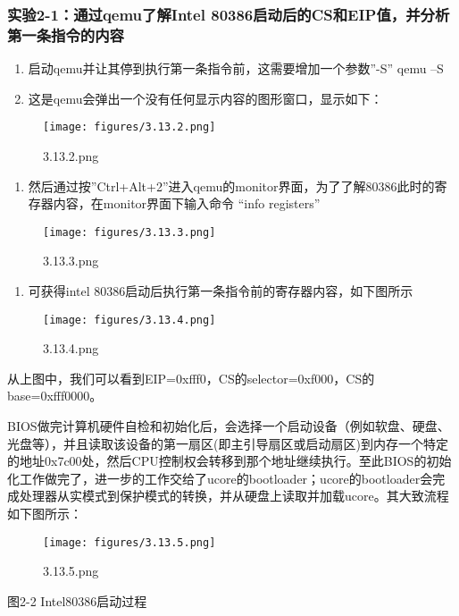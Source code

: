 \subsubsection{实验2-1：通过qemu了解Intel
80386启动后的CS和EIP值，并分析第一条指令的内容}\label{ux5b9eux9a8c2-1ux901aux8fc7qemuux4e86ux89e3intel-80386ux542fux52a8ux540eux7684csux548ceipux503cux5e76ux5206ux6790ux7b2cux4e00ux6761ux6307ux4ee4ux7684ux5185ux5bb9}

\begin{enumerate}
\def\labelenumi{\arabic{enumi}.}
\tightlist
\item
  启动qemu并让其停到执行第一条指令前，这需要增加一个参数''-S'' qemu --S
\item
  这是qemu会弹出一个没有任何显示内容的图形窗口，显示如下：
\end{enumerate}

\begin{figure}[htbp]
\centering
\texttt{[image: figures/3.13.2.png]}
\caption{3.13.2.png}
\end{figure}

\begin{enumerate}
\def\labelenumi{\arabic{enumi}.}
\setcounter{enumi}{2}
\tightlist
\item
  然后通过按''Ctrl+Alt+2''进入qemu的monitor界面，为了了解80386此时的寄存器内容，在monitor界面下输入命令
  ``info registers''
\end{enumerate}

\begin{figure}[htbp]
\centering
\texttt{[image: figures/3.13.3.png]}
\caption{3.13.3.png}
\end{figure}

\begin{enumerate}
\def\labelenumi{\arabic{enumi}.}
\setcounter{enumi}{3}
\tightlist
\item
  可获得intel 80386启动后执行第一条指令前的寄存器内容，如下图所示
\end{enumerate}

\begin{figure}[htbp]
\centering
\texttt{[image: figures/3.13.4.png]}
\caption{3.13.4.png}
\end{figure}

从上图中，我们可以看到EIP=0xfff0，CS的selector=0xf000，CS的base=0xfff0000。

BIOS做完计算机硬件自检和初始化后，会选择一个启动设备（例如软盘、硬盘、光盘等），并且读取该设备的第一扇区(即主引导扇区或启动扇区)到内存一个特定的地址0x7c00处，然后CPU控制权会转移到那个地址继续执行。至此BIOS的初始化工作做完了，进一步的工作交给了ucore的bootloader；ucore的bootloader会完成处理器从实模式到保护模式的转换，并从硬盘上读取并加载ucore。其大致流程如下图所示：

\begin{figure}[htbp]
\centering
\texttt{[image: figures/3.13.5.png]}
\caption{3.13.5.png}
\end{figure}

图2-2 Intel80386启动过程

